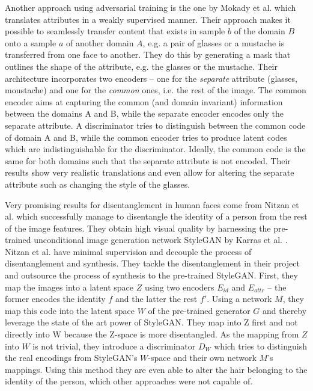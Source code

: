 \documentclass[conference]{IEEEtran}
\begin{document}
Another approach using adversarial training is the one by Mokady et al. which translates attributes in a weakly supervised manner. Their approach makes it possible to seamlessly transfer content that exists in sample $b$ of the domain $B$ onto a sample $a$ of another domain $A$, e.g. a pair of glasses or a mustache is transferred from one face to another. They do this by generating a mask that outlines the shape of the attribute, e.g. the glasses or the mustache.
Their architecture incorporates two encoders -- one for the \textit{separate} attribute (glasses, moustache) and one for the \textit{common} ones, i.e. the rest of the image. 
The common encoder aims at capturing the common (and domain invariant) information between the domains A and B, while the separate encoder encodes only the separate attribute.
A discriminator tries to distinguish between the common code of domain A and B, while the common encoder tries to produce latent codes which are indistinguishable for the discriminator. Ideally, the common code is the same for both domains such that the separate attribute is not encoded. Their results show very realistic translations and even allow for altering the separate attribute such as changing the style of the glasses.

Very promising results for disentanglement in human faces come from Nitzan et al. which successfully manage to disentangle the identity of a person from the rest of the image features. They obtain high visual quality by harnessing the pre-trained unconditional image generation network StyleGAN by Karras et al. \cite{karras2019style}.
Nitzan et al. have minimal supervision and decouple the process of disentanglement and synthesis. They tackle the disentanglement in their project and outsource the process of synthesis to the pre-trained StyleGAN. First, they map the images into a latent space $Z$ using two encoders $E_{id}$ and $E_{attr}$ -- the former encodes the identity $f$ and the latter the rest $f'$. Using a network $M$, they map this code into the latent space $W$ of the pre-trained generator $G$ and thereby leverage the state of the art power of StyleGAN. They map into Z first and not directly into W because the Z-space is more disentangled. As the mapping from $Z$ into $W$ is not trivial, they introduce a discriminator $D_W$ which tries to distinguish the real encodings from StyleGAN’s $W$-space and their own network $M$’s mappings. Using this method they are even able to alter the hair belonging to the identity of the person, which other approaches were not capable of.
\end{document}
